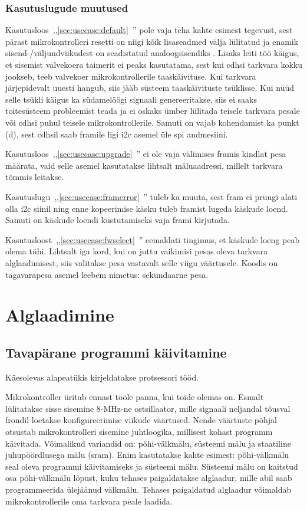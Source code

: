 \documentclass[12pt,a4paper]{article}
\begin{document}
\subsubsection{Kasutuslugude muutused}
Kasutusloos~,,\ref{sec:usecase:default}~'' pole
vaja teha kahte esimest tegevust, sest pärast mikrokontrolleri resetti on niigi
kõik lisaseadmed välja lülitatud ja enamik sisend-/väljundviikudest on
seadistatud analoogsisendiks \cite{f1rm,f2rm}. Lisaks leiti töö käigus, et
sisemist valvekoera taimerit ei peaks kasutatama, sest kui \gls{cdhs}i tarkvara
kokku jookseb, teeb valvekoer mikrokontrollerile taaskäivituse. Kui tarkvara
järjepidevalt uuesti hangub, siis jääb süsteem taaskäivituste tsüklisse. Kui
nüüd selle tsükli käigus ka südamelöögi signaali genereeritakse, siis ei saaks
toitesüsteem probleemist teada ja ei oskaks ümber lülitada teisele tarkvara
pesale või \gls{cdhs}i puhul teisele mikrokontrollerile. Samuti on vajab
kohendamist ka punkt (d), sest \gls{cdhs}il saab \gls{fram}ile ligi \gls{i2c} asemel
üle \gls{spi} andmesiini.

Kasutusloos~,,\ref{sec:usecase:upgrade}~'' ei ole
vaja välimises \gls{fram}is kindlat pesa määrata, vaid selle asemel kasutatakse
lihtsalt mälu\-aadressi, millelt tarkvara tõmmis leitakse.

Kasutuslugu~,,\ref{sec:usecase:framerror}~''
tuleb ka muuta, sest \gls{fram} ei pruugi alati olla \gls{i2c} siinil ning enne
kopeerimise käsku tuleb \gls{fram}ist lugeda käskude loend. Samuti on käskude
loendi kustutamiseks vaja \gls{fram}i kirjutada.

Kasutusloost~,,\ref{sec:usecase:fwselect}~''
eemaldati tingimus, et käskude loeng peab olema tühi.  Lihtsalt iga kord, kui on
juttu vaikimisi pesas oleva tarkvara alglaadimisest, siis valitakse pesa
vastavalt selle viigu väärtusele. Koodis on tagavarapesa asemel leebem nimetus:
sekundaarne pesa.

\section{Alglaadimine}
\label{sec:boot}
\subsection{Tavapärane programmi käivitamine}
\label{sec:boot:tava}
Käesolevas alapeatükis kirjeldatakse protsessori tööd.

Mikrokontroller üritab ennast tööle panna, kui toide olemas on. Esmalt
lülitatakse sisse sisemine 8-MHz-ne ostsillaator, mille signaali neljandal
tõusval frondil loetakse konfigureerimise viikude väärtused. Nende väärtuste
põhjal otsustab mikrokontrolleri sisemine juhtloogika, millisest kohast programm
käivitada. Võimalikud variandid on: põhi-välkmälu, süsteemi mälu ja staatiline
juhupöördlusega mälu (\gls{sram}).  Enim kasutatakse kahte esimest:
põhi-välkmälu seal oleva programmi käivitamiseks ja süsteemi mälu. Süsteemi mälu
on kaitstud osa põhi-välkmälu lõpust, kuhu tehases paigaldatakse alglaadur,
mille abil saab programmeerida ülejäänud välkmälu. Tehases paigaldatud alglaadur
võimaldab mikrokontrollerile oma tarkvara peale laadida.
\end{document}
